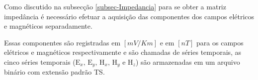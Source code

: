         \begin{table}[H]
                \centering
                \caption{Taxas de Aquisições frequentemente usadas para equipamentos ADU06 e ADU07.}
                \label{tab_taxa_aquisicao}
            \end{table}
        
        Como discutido na subsecção \ref{subsec-Impedancia} para se obter a matriz impedância é necessário efetuar a aquisição das componentes dos campos elétricos e magnéticos separadamente.
        
        Essas componentes são registradas em $[mV/Km]$ e em $[nT]$ para os campos elétricos e magnéticos respectivamente e são chamadas de séries temporais, as cinco séries temporais ($\textrm{E}_x,\, \textrm{E}_y, \, \textrm{H}_x, \, \textrm{H}_y \, \, \textrm{e} \, \, \textrm{H}_z$) são armazenadas em um arquivo binário com extensão padrão TS.
        
